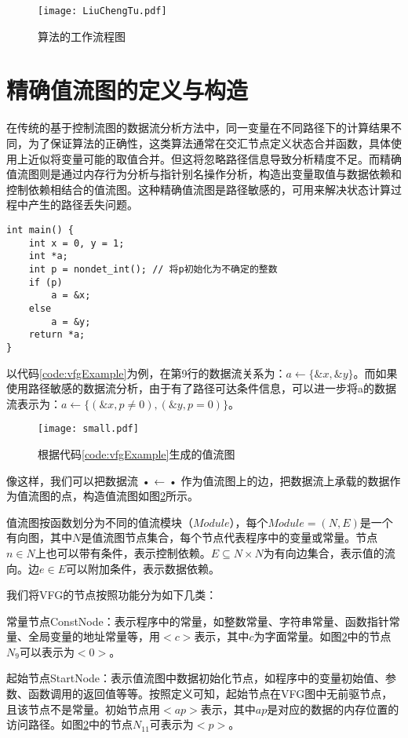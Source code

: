 \begin{figure}[H]
	\centering
	\texttt{[image: LiuChengTu.pdf]}
	\caption{算法的工作流程图}
	\label{fig:流程图}
\end{figure}

\section{精确值流图的定义与构造}

在传统的基于控制流图的数据流分析方法中，同一变量在不同路径下的计算结果不同，为了保证算法的正确性，这类算法通常在交汇节点定义状态合并函数，具体使用上近似将变量可能的取值合并。但这将忽略路径信息导致分析精度不足。而精确值流图则是通过内存行为分析与指针别名操作分析，构造出变量取值与数据依赖和控制依赖相结合的值流图。这种精确值流图是路径敏感的，可用来解决状态计算过程中产生的路径丢失问题。

\begin{lstlisting}[label=code:vfgExample,caption=代码样例]
int main() {
	int x = 0, y = 1;
	int *a;
	int p = nondet_int(); // 将p初始化为不确定的整数
	if (p)
		a = &x;
	else
		a = &y;
	return *a;
}
\end{lstlisting}

以代码\ref{code:vfgExample}为例，在第9行的数据流关系为：$ a \gets \{\&x, \&y\} $。而如果使用路径敏感的数据流分析，由于有了路径可达条件信息，可以进一步将a的数据流表示为：$ a \gets \{(\&x, p ≠ 0), (\&y, p = 0)\} $。

\begin{figure}[H]
	\centering
	\texttt{[image: small.pdf]}
	\caption{根据代码\ref{code:vfgExample}生成的值流图}
	\label{fig:small}
\end{figure}

像这样，我们可以把数据流 • ← • 作为值流图上的边，把数据流上承载的数据作为值流图的点，构造值流图如图\ref{fig:small}所示。

值流图按函数划分为不同的值流模块（$ Module $），每个$ Module = (N, E) $是一个有向图，其中$ N $是值流图节点集合，每个节点代表程序中的变量或常量。节点$ n ∈ N $上也可以带有条件，表示控制依赖。$ E ⊆ N × N $为有向边集合，表示值的流向。边$ e ∈ E $可以附加条件，表示数据依赖。

我们将VFG的节点按照功能分为如下几类：

常量节点ConstNode：表示程序中的常量，如整数常量、字符串常量、函数指针常量、全局变量的地址常量等，用$ <c> $表示，其中$ c $为字面常量。如图\ref{fig:small}中的节点$ N_{9} $可以表示为$ <0> $。

起始节点StartNode：表示值流图中数据初始化节点，如程序中的变量初始值、参数、函数调用的返回值等等。按照定义可知，起始节点在VFG图中无前驱节点，且该节点不是常量。初始节点用$ <ap> $表示，其中$ ap $是对应的数据的内存位置的访问路径。如图\ref{fig:small}中的节点$ N_{11} $可表示为$ <p> $。

